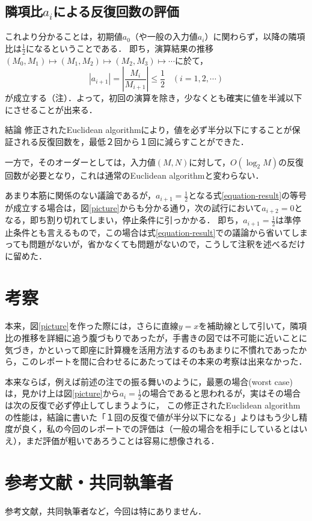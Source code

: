 \documentclass[uplatex, dvipdfmx]{jsarticle}
\begin{document}
\subsection{隣項比$a_i$による反復回数の評価}

これより分かることは，初期値$a_0$（や一般の入力値$a_i$）に関わらず，以降の隣項比は$\frac{1}{2}$になるということである．
即ち，演算結果の推移$(M_0,M_1)\mapsto (M_1,M_2)\mapsto (M_2,M_3)\mapsto\cdots$に於て，
\begin{equation}\label{equation-result}
    |a_{i+1}|=\left| \frac{M_i}{M_{i+1}} \right|\le\frac{1}{2}\;\;\; (i=1,2,\cdots) 
\end{equation}
が成立する（注）．よって，初回の演算を除き，少なくとも確実に値を半減以下にさせることが出来る．

\begin{itembox}[l]{結論}
    修正されたEuclidean algorithmにより，値を必ず半分以下にすることが保証される反復回数を，最低２回から１回に減らすことができた．

    一方で，そのオーダーとしては，入力値$(M,N)$に対して，$O(\log_2M)$の反復回数が必要となり，これは通常のEuclidean algorithmと変わらない．
\end{itembox}

\begin{remark*}
    あまり本筋に関係のない議論であるが，$a_{i+1}=\frac{1}{2}$となる式\ref{equation-result}の等号が成立する場合は，図\ref{picture}からも分かる通り，次の試行において$a_{i+2}=0$となる，即ち割り切れてしまい，停止条件に引っかかる．
    即ち，$a_{i+1}=\frac{1}{2}$は準停止条件とも言えるもので，この場合は式\ref{equation-result}での議論から省いてしまっても問題がないが，省かなくても問題がないので，こうして注釈を述べるだけに留めた．
\end{remark*}

\section{考察}
本来，図\ref{picture}を作った際には，さらに直線$y=x$を補助線として引いて，隣項比の推移を詳細に追う腹づもりであったが，手書きの図では不可能に近いことに気づき，かといって即座に計算機を活用方法するのもあまりに不慣れであったから，このレポートを間に合わせるにあたってはその本来の考察は出来なかった．

本来ならば，例えば前述の注での振る舞いのように，最悪の場合(worst case)は，見かけ上は図\ref{picture}から$a_i=\frac{1}{2}$の場合であると思われるが，実はその場合は次の反復で必ず停止してしまうように，
この修正されたEuclidean algorithmの性能は，結論に書いた「１回の反復で値が半分以下になる」よりはもう少し精度が良く，私の今回のレポートでの評価は（一般の場合を相手にしているとはいえ），まだ評価が粗いであろうことは容易に想像される．

\section{参考文献・共同執筆者}
参考文献，共同執筆者など，今回は特にありません．
\end{document}
